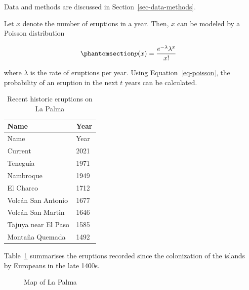 \documentclass[
]{agujournal2019}
\begin{document}
Data and methods are discussed in Section~\ref{sec-data-methods}.

Let \(x\) denote the number of eruptions in a year. Then, \(x\) can be
modeled by a Poisson distribution

\begin{equation}\phantomsection\label{eq-poisson}{
p(x) = \frac{e^{-\lambda} \lambda^{x}}{x !}
}\end{equation}

where \(\lambda\) is the rate of eruptions per year. Using
Equation~\ref{eq-poisson}, the probability of an eruption in the next
\(t\) years can be calculated.

\begin{longtable}[]{@{}ll@{}}
\caption{Recent historic eruptions on La
Palma}\label{tbl-history}\tabularnewline
\toprule\noalign{}
Name & Year \\
\midrule\noalign{}
\endfirsthead
\toprule\noalign{}
Name & Year \\
\midrule\noalign{}
\endhead
\bottomrule\noalign{}
\endlastfoot
Current & 2021 \\
Teneguía & 1971 \\
Nambroque & 1949 \\
El Charco & 1712 \\
Volcán San Antonio & 1677 \\
Volcán San Martin & 1646 \\
Tajuya near El Paso & 1585 \\
Montaña Quemada & 1492 \\
\end{longtable}

Table~\ref{tbl-history} summarises the eruptions recorded since the
colonization of the islands by Europeans in the late 1400s.

\begin{figure}


\caption{\label{fig-map}Map of La Palma}

\end{figure}%
\end{document}
